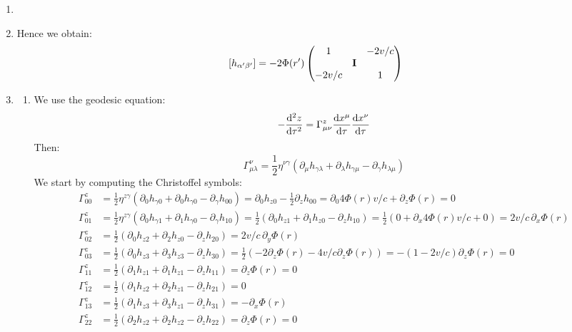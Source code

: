 \documentclass[10pt,a4paper]{article}
\begin{document}
\begin{enumerate}
\item 

\item Hence we obtain:
\[
[h_{\alpha' \beta'}] = 
-2 \Phi(r')
\begin{pmatrix}
1 & & -2v/c\\
 & \vb{I} & \\
 -2v/c & & 1
\end{pmatrix}
\]

\item \begin{enumerate}

\item We use the geodesic equation:
\[
-\dv[2]{z}{\tau} = \Gamma^z_{\mu \nu} \dv{x^\mu}{\tau} \dv{x^\nu}{\tau}
\]
Then:
\[
\Gamma^\nu_{\mu \lambda} = \frac{1}{2}\eta^{\nu \gamma}(\partial_\mu h_{\gamma \lambda} + \partial_{\lambda} h_{\gamma \mu} - \partial_\gamma h_{\lambda \mu})
\]
We start by computing the Christoffel symbols:
\begin{align*}
\Gamma^z_{00} &= \frac{1}{2} \eta^{z \gamma}( \partial_0 h_{\gamma 0} + \partial_0 h_{\gamma 0} - \partial_\gamma h_{00}) = \partial_0 h_{z 0} - \frac{1}{2} \partial_z h_{0 0} = \partial_0 4 \Phi(r) v /c + \partial_z \Phi(r) = 0\\
\Gamma^z_{0 1} &= \frac{1}{2} \eta^{z \gamma} (\partial_0 h_{\gamma 1} + \partial_1 h_{\gamma 0} - \partial_\gamma h_{10}) = \frac{1}{2}(\partial_0 h_{z 1} + \partial_1 h_{z 0} - \partial_z h_{10}) = \frac{1}{2}(0 + \partial_x 4 \Phi(r) v /c + 0) = 2 v /c\,  \partial_x \Phi(r)\\
\Gamma^z_{02} &= \frac{1}{2}(\partial_0 h_{z2} + \partial_2 h_{z0} - \partial_z h_{20}) = 2v/c\, \partial_y \Phi(r)\\
\Gamma^z_{0 3} &= \frac{1}{2}(\partial_0 h_{z3} + \partial_3 h_{z3} - \partial_z h_{30} ) = \frac{1}{2}(-2\partial_z \Phi(r) - 4v/c \partial_z \Phi(r) ) = -(1 - 2v/c) \partial_z \Phi(r) = 0\\
\Gamma^z_{11} &= \frac{1}{2} (\partial_1 h_{z 1} + \partial_1 h_{z 1} - \partial_z h_{11}) =  \partial_z \Phi(r) = 0 \\
\Gamma^z_{12} &= \frac{1}{2}(\partial_1 h_{z 2} + \partial_2 h_{z 1} - \partial_z h_{21}) = 0\\
\Gamma^z_{13} &= \frac{1}{2}( \partial_1 h_{z3} + \partial_3 h_{z1} - \partial_z h_{31} ) = - \partial_x \Phi(r)\\
\Gamma^{z}_{22} &= \frac{1}{2}(\partial_2 h_{z2} + \partial_2 h_{z2} - \partial_z h_{22}) = \partial_z \Phi(r) = 0\\

\end{align*}
\end{enumerate}
\end{enumerate}
\end{document}
